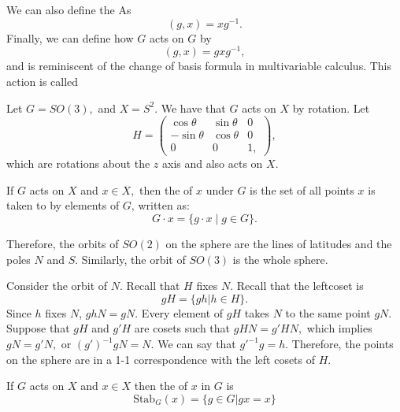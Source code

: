 \documentclass{article}
\numberwithin{equation}{section}
\begin{document}
We can also define the  As
\begin{equation*}
    (g,x) = xg^{-1}.
\end{equation*}
Finally, we can define how $G$ acts on $G$ by 
\begin{equation*}
    (g,x) = gxg^{-1},
\end{equation*}
and is reminiscent of the change of basis formula in multivariable calculus. This action is called 
\begin{example}
    Let $G = SO(3),$ and $X=S^2.$ We have that $G$ acts on $X$ by rotation. Let 
    \begin{equation*}
        H = \begin{pmatrix}
            \cos\theta & \sin\theta & 0 \\ 
            -\sin\theta & \cos\theta & 0 \\
            0 & 0 & 1,
        \end{pmatrix},
    \end{equation*}
    which are rotations about the $z$ axis and also acts on $X.$
\end{example}
\begin{definition}
    If $G$ acts on $X$ and $x\in X,$ then the  of $x$ under $G$ is the set of all points $x$ is taken to by elements of $G$, written as:
    \begin{equation*}
        G \cdot x = \{g\cdot x \mid g\in G\}.
    \end{equation*}
\end{definition}
Therefore, the orbits of $SO(2)$ on the sphere are the lines of latitudes and the poles $N$ and $S.$ Similarly, the orbit of $SO(3)$ is the whole sphere.

Consider the orbit of $N$. Recall that $H$ fixes $N$. Recall that the leftcoset is 
\begin{equation*}
    gH = \{gh|h\in H\}.
\end{equation*}
Since $h$ fixes $N$, $ghN=gN.$ Every element of $gH$ takes $N$ to the same point $gN.$ Suppose that $gH$ and $g'H$ are cosets such that $gHN = g'HN,$ which implies $gN=g'N,$ or $(g')^{-1}gN=N.$ We can say that $g'^{-1}g=h.$ Therefore, the points on the sphere are in a 1-1 correspondence with the left cosets of $H$.
\begin{definition}
    If $G$ acts on $X$ and $x\in X$ then the  of $x$ in $G$ is 
    \begin{equation*}
        \text{Stab}_G(x) = \{g\in G| gx=x\}
    \end{equation*}
\end{definition}
\end{document}
